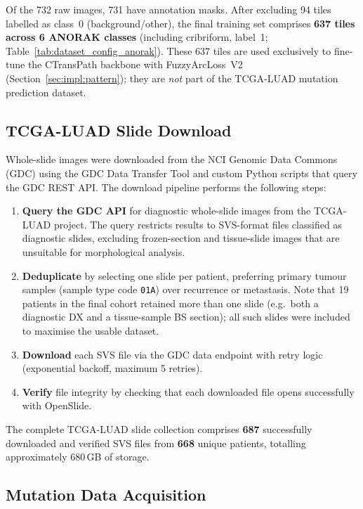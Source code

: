 Of the 732 raw images, 731 have annotation masks.
After excluding 94 tiles labelled as class~0 (background/other),
the final training set comprises \textbf{637 tiles across 6 ANORAK
classes} (including cribriform, label~1;
Table~\ref{tab:dataset_config_anorak}).
These 637 tiles are used exclusively to fine-tune the CTransPath
backbone with FuzzyArcLoss~V2 (Section~\ref{sec:impl:pattern});
they are \emph{not} part of the TCGA-LUAD mutation prediction dataset.


\subsection{TCGA-LUAD Slide Download}
\label{sec:impl:data:download}

Whole-slide images were downloaded from the NCI Genomic Data Commons (GDC)
using the GDC Data Transfer Tool and custom Python scripts that query the
GDC REST API.
The download pipeline performs the following steps:

\begin{enumerate}
    \item \textbf{Query the GDC API} for diagnostic whole-slide images
    from the TCGA-LUAD project.  The query restricts results to SVS-format
    files classified as diagnostic slides, excluding frozen-section and
    tissue-slide images that are unsuitable for morphological analysis.
    \item \textbf{Deduplicate} by selecting one slide per patient,
    preferring primary tumour samples (sample type code \texttt{01A})
    over recurrence or metastasis.
    Note that 19 patients in the final cohort retained more than one slide
    (e.g.\ both a diagnostic DX and a tissue-sample BS section); all such
    slides were included to maximise the usable dataset.
    \item \textbf{Download} each SVS file via the GDC data endpoint with
    retry logic (exponential backoff, maximum 5 retries).
    \item \textbf{Verify} file integrity by checking that each downloaded
    file opens successfully with OpenSlide.
\end{enumerate}

The complete TCGA-LUAD slide collection comprises \textbf{687} successfully
downloaded and verified SVS files from \textbf{668} unique patients,
totalling approximately 680\,GB of storage.

\subsection{Mutation Data Acquisition}
\label{sec:impl:data:maf}

